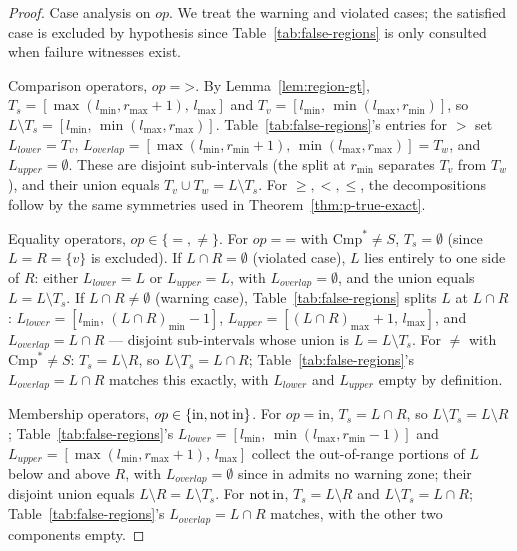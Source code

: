 \documentclass[pdflatex,sn-basic]{sn-jnl}%
\theoremstyle{thmstyleone}%
\theoremstyle{thmstyletwo}%
\theoremstyle{thmstylethree}%
\begin{document}
\begin{proof}
Case analysis on $op$.
We treat the warning and violated cases; the satisfied case is excluded by hypothesis since Table~\ref{tab:false-regions} is only consulted when failure witnesses exist.

Comparison operators, $op = \mathord{>}$.
By Lemma~\ref{lem:region-gt}, $T_s = [\max(l_{\min}, r_{\max}+1),\, l_{\max}]$ and $T_v = [l_{\min},\, \min(l_{\max}, r_{\min})]$, so $L \setminus T_s = [l_{\min},\, \min(l_{\max}, r_{\max})]$.
Table~\ref{tab:false-regions}'s entries for $>$ set $L_{\mathit{lower}} = T_v$, $L_{\mathit{overlap}} = [\max(l_{\min}, r_{\min}+1),\, \min(l_{\max}, r_{\max})] = T_w$, and $L_{\mathit{upper}} = \emptyset$.
These are disjoint sub-intervals (the split at $r_{\min}$ separates $T_v$ from $T_w$), and their union equals $T_v \cup T_w = L \setminus T_s$.
For $\geq, <, \leq$, the decompositions follow by the same symmetries used in Theorem~\ref{thm:p-true-exact}.

Equality operators, $op \in \{=, \neq\}$.
For $op = \mathord{=}$ with $\text{Cmp}^* \neq S$, $T_s = \emptyset$ (since $L = R = \{v\}$ is excluded).
If $L \cap R = \emptyset$ (violated case), $L$ lies entirely to one side of $R$: either $L_{\mathit{lower}} = L$ or $L_{\mathit{upper}} = L$, with $L_{\mathit{overlap}} = \emptyset$, and the union equals $L = L \setminus T_s$.
If $L \cap R \neq \emptyset$ (warning case), Table~\ref{tab:false-regions} splits $L$ at $L \cap R$: $L_{\mathit{lower}} = [l_{\min},\, (L \cap R)_{\min} - 1]$, $L_{\mathit{upper}} = [(L \cap R)_{\max} + 1,\, l_{\max}]$, and $L_{\mathit{overlap}} = L \cap R$ --- disjoint sub-intervals whose union is $L = L \setminus T_s$.
For $\neq$ with $\text{Cmp}^* \neq S$: $T_s = L \setminus R$, so $L \setminus T_s = L \cap R$; Table~\ref{tab:false-regions}'s $L_{\mathit{overlap}} = L \cap R$ matches this exactly, with $L_{\mathit{lower}}$ and $L_{\mathit{upper}}$ empty by definition.

Membership operators, $op \in \{\text{in}, \text{not\,in}\}$.
For $op = \text{in}$, $T_s = L \cap R$, so $L \setminus T_s = L \setminus R$; Table~\ref{tab:false-regions}'s $L_{\mathit{lower}} = [l_{\min},\, \min(l_{\max}, r_{\min}-1)]$ and $L_{\mathit{upper}} = [\max(l_{\min}, r_{\max}+1),\, l_{\max}]$ collect the out-of-range portions of $L$ below and above $R$, with $L_{\mathit{overlap}} = \emptyset$ since $\text{in}$ admits no warning zone; their disjoint union equals $L \setminus R = L \setminus T_s$.
For $\text{not\,in}$, $T_s = L \setminus R$ and $L \setminus T_s = L \cap R$; Table~\ref{tab:false-regions}'s $L_{\mathit{overlap}} = L \cap R$ matches, with the other two components empty.
\end{proof}
\end{document}
